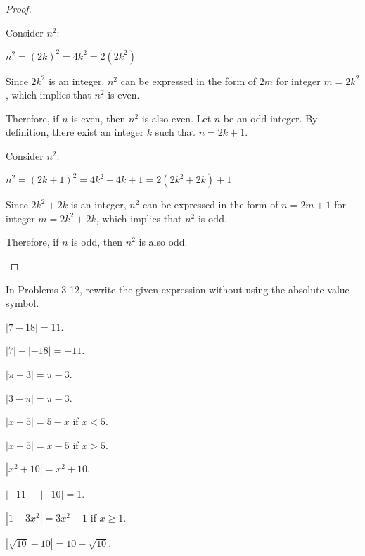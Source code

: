 \begin{questions}
\begin{proof}
\begin{tasks}
      Consider $n^2$:

      $n^2=(2k)^2=4k^2=2(2k^2)$

      Since $2k^2$ is an integer, $n^2$ can be expressed in the form of $2m$ for integer $m=2k^2$, which implies that $n^2$ is even.

      Therefore, if $n$ is even, then $n^2$ is also even.
      \task Let $n$ be an odd integer. By definition, there exist an integer $k$ such that $n=2k+1$.

      Consider $n^2$:

      $n^2=(2k+1)^2 = 4k^2+4k+1=2(2k^2+2k) + 1$

      Since $2k^2+2k$ is an integer, $n^2$ can be expressed in the form of $n = 2m+1$ for integer $m=2k^2+2k$, which implies that $n^2$ is odd.

      Therefore, if $n$ is odd, then $n^2$ is also odd.
    \end{tasks}
  \end{proof}
  In Problems 3-12, rewrite the given expression without using the absolute value symbol.
  \begin{solution}
    \item $ \left| 7 - 18 \right| = 11 $.
    \item $ \left| 7 \right| - \left| - 18 \right| = -11 $.
    \item $ \left| \pi - 3\right| = \pi - 3 $.
    \item $ \left| 3 - \pi \right| = \pi - 3 $.
    \item $ \left| x - 5 \right| = 5 - x $ if $ x < 5 $.
    \item $ \left| x - 5 \right| = x - 5 $ if $ x > 5 $.
    \item $ \left| x^2 + 10 \right| = x^2 + 10$.
    \item $ \left| -11 \right| - \left| -10 \right| = 1 $.
    \item $ \left| 1 - 3x^2 \right| = 3x^2 - 1 $ if $ x \geq 1 $.
    \item $ \left| \sqrt{10} - 10 \right| = 10 - \sqrt{10} $.
  \end{solution}

\end{questions}